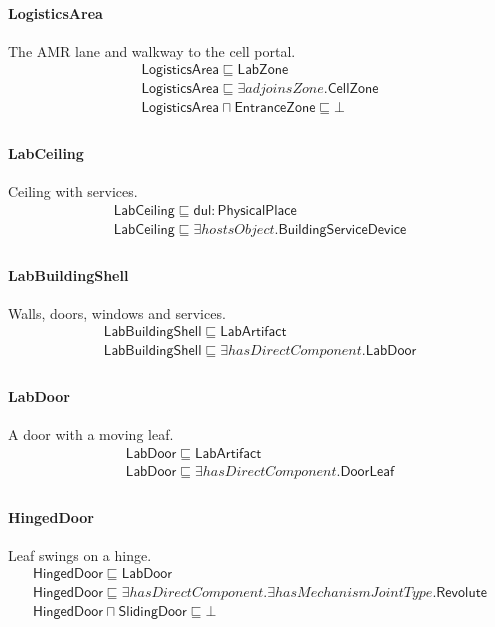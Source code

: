 \documentclass[10pt]{article}
\begin{document}
\paragraph{LogisticsArea} The AMR lane and walkway to the cell portal.
\[\begin{array}{l}
\mathsf{LogisticsArea} \sqsubseteq  \mathsf{LabZone} \\
\mathsf{LogisticsArea} \sqsubseteq  \exists \mathit{adjoinsZone}.\mathsf{CellZone} \\
\mathsf{LogisticsArea} \sqcap  \mathsf{EntranceZone} \sqsubseteq  \bot  \\
\end{array}\]
\paragraph{LabCeiling} Ceiling with services.
\[\begin{array}{l}
\mathsf{LabCeiling} \sqsubseteq  \mathsf{dul{:}PhysicalPlace} \\
\mathsf{LabCeiling} \sqsubseteq  \exists \mathit{hostsObject}.\mathsf{BuildingServiceDevice} \\
\end{array}\]
\paragraph{LabBuildingShell} Walls, doors, windows and services.
\[\begin{array}{l}
\mathsf{LabBuildingShell} \sqsubseteq  \mathsf{LabArtifact} \\
\mathsf{LabBuildingShell} \sqsubseteq  \exists \mathit{hasDirectComponent}.\mathsf{LabDoor} \\
\end{array}\]
\paragraph{LabDoor} A door with a moving leaf.
\[\begin{array}{l}
\mathsf{LabDoor} \sqsubseteq  \mathsf{LabArtifact} \\
\mathsf{LabDoor} \sqsubseteq  \exists \mathit{hasDirectComponent}.\mathsf{DoorLeaf} \\
\end{array}\]
\paragraph{HingedDoor} Leaf swings on a hinge.
\[\begin{array}{l}
\mathsf{HingedDoor} \sqsubseteq  \mathsf{LabDoor} \\
\mathsf{HingedDoor} \sqsubseteq  \exists \mathit{hasDirectComponent}.\exists \mathit{hasMechanismJointType}.\mathsf{Revolute} \\
\mathsf{HingedDoor} \sqcap  \mathsf{SlidingDoor} \sqsubseteq  \bot  \\
\end{array}\]
\end{document}
